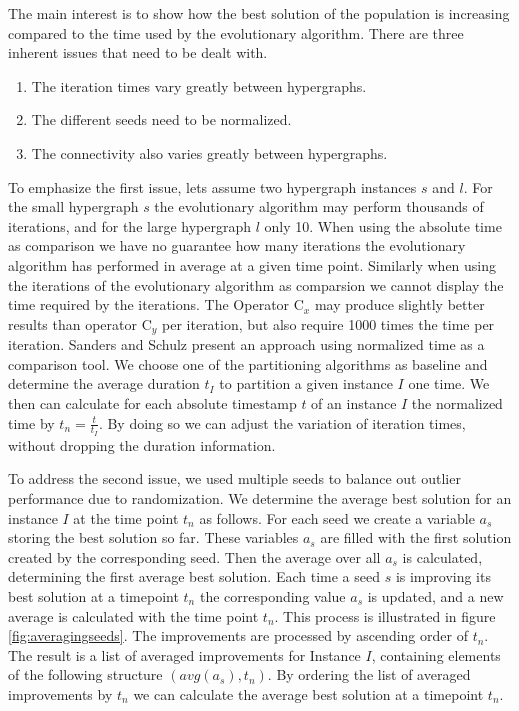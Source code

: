 \documentclass[a4paper,12pt,titlepage, BCOR7mm,headsepline]{scrbook}
\numberwithin{equation}{section}
\begin{document}
The main interest is to show how the best solution of the population is increasing compared to the time used by the evolutionary algorithm. There are three inherent issues that need to be dealt with. 
\begin{enumerate}
\item The iteration times vary greatly between hypergraphs. 
\item The different seeds need to be normalized.
\item The connectivity also varies greatly between hypergraphs.

\end{enumerate}
To emphasize the first issue, lets assume two hypergraph instances $s$ and $l$. For the small hypergraph $s$ the evolutionary algorithm may perform thousands of iterations, and for the large hypergraph $l$ only 10. When using the absolute time as comparison we have no guarantee how many iterations the evolutionary algorithm has performed in average at a given time point. Similarly when using the iterations of the evolutionary algorithm as comparsion we cannot display the time required by the iterations. The Operator C$_x$ may produce slightly better results than operator C$_y$ per iteration, but also require 1000 times the time per iteration. Sanders and Schulz \cite{sanders2012distributed} present an approach using normalized time as a comparison tool. We choose one of the partitioning algorithms as baseline and determine the average duration $t_I$ to partition a given instance $I$ one time. We then can calculate for each absolute timestamp $t$ of an instance $I$ the normalized time by $t_n = \frac{t}{t_I}$. By doing so we can adjust the variation of iteration times, without dropping the duration information. 

To address the second issue, we used multiple seeds to balance out outlier performance due to randomization. We determine the average best solution for an instance $I$ at the time point $t_n$ as follows. For each seed we create a variable $a_s$ storing the best solution so far. These variables $a_s$ are filled with the first solution created by the corresponding seed. Then the average over all $a_s$ is calculated, determining the first average best solution. Each time a seed $s$ is improving its best solution at a timepoint $t_n$ the corresponding value $a_s$ is updated, and a new average is calculated with the time point $t_n$. This process is illustrated in figure \ref{fig:averagingseeds}. The improvements are processed by ascending order of $t_n$. The result is a list of averaged improvements for Instance $I$, containing elements of the following structure $(avg(a_s), t_n)$. By ordering the list of averaged improvements by $t_n$ we can calculate the average best solution at a timepoint $t_n$.
\end{document}
